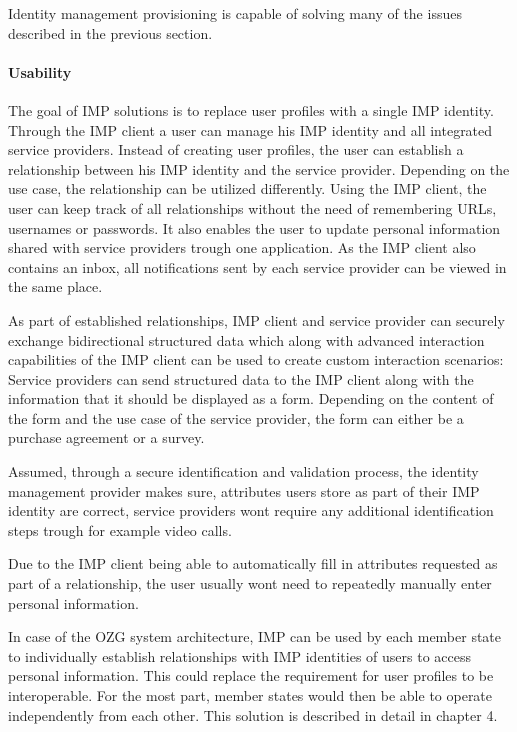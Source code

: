 Identity management provisioning is capable of solving many of the issues described in the previous section.

\paragraph{Usability}

The goal of IMP solutions is to replace user profiles with a single IMP identity. Through the IMP client a user can manage his IMP identity and all integrated service providers. Instead of creating user profiles, the user can establish a relationship between his IMP identity and the service provider. Depending on the use case, the relationship can be utilized differently. Using the IMP client, the user can keep track of all relationships without the need of remembering URLs, usernames or passwords. It also enables the user to update personal information shared with service providers trough one application. As the IMP client also contains an inbox, all notifications sent by each service provider can be viewed in the same place.

As part of established relationships, IMP client and service provider can securely exchange bidirectional structured data which along with advanced interaction capabilities of the IMP client can be used to create custom interaction scenarios: Service providers can send structured data to the IMP client along with the information that it should be displayed as a form. Depending on the content of the form and the use case of the service provider, the form can either be a purchase agreement or a survey. 

Assumed, through a secure identification and validation process, the identity management provider makes sure, attributes users store as part of their IMP identity are correct, service providers wont require any additional identification steps trough for example video calls.

Due to the IMP client being able to automatically fill in attributes requested as part of a relationship, the user usually wont need to repeatedly manually enter personal information.

In case of the OZG system architecture, IMP can be used by each member state to individually establish relationships with IMP identities of users to access personal information. This could replace the requirement for user profiles to be interoperable. For the most part, member states would then be able to operate independently from each other. This solution is described in detail in chapter 4.

